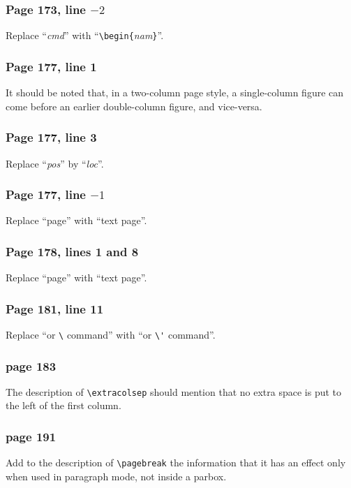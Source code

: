 \subsubsection*{Page 173, line $-2$}
Replace ``{\em cmd\/}'' with ``\verb|\begin{|{\em nam\/}\verb|}|''.
 
\subsubsection*{Page 177, line 1}
It should be noted that, in a two-column page style, a single-column
figure can come before an earlier double-column figure, and vice-versa.
 
\subsubsection*{Page 177, line 3}
Replace ``{\em pos\/}'' by ``{\em loc\/}''.
 
\subsubsection*{Page 177, line $-1$}
Replace ``page'' with ``text page''.
 
\subsubsection*{Page 178, lines 1 and 8}
Replace ``page'' with ``text page''.  
 
\subsubsection*{Page 181, line 11}
Replace ``or \verb|\| command'' with ``or \verb|\'| command''.
 
\subsubsection*{page 183}
The description of \verb|\extracolsep| should mention that no extra
space is put to the left of the first column.
 
\subsubsection*{page 191}
Add to the description of \verb|\pagebreak| the
information that it has an effect only when used in paragraph mode,
not inside a parbox.
 
